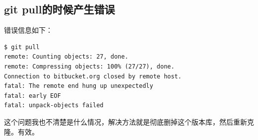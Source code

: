 \documentclass[a4paper,12pt]{ctexart}
\begin{document}
\subsection{git pull的时候产生错误}
错误信息如下：
\begin{verbatim}
$ git pull
remote: Counting objects: 27, done.
remote: Compressing objects: 100% (27/27), done.
Connection to bitbucket.org closed by remote host.
fatal: The remote end hung up unexpectedly
fatal: early EOF
fatal: unpack-objects failed
\end{verbatim}
这个问题我也不清楚是什么情况，解决方法就是彻底删掉这个版本库，然后重新克隆。有效。
\end{document}
